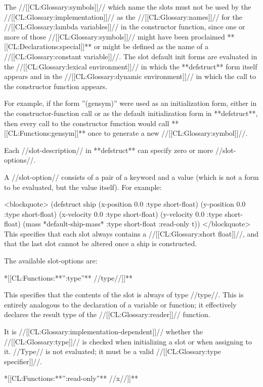 The //[[CL:Glossary:symbols]]// which name the slots must not be used by the //[[CL:Glossary:implementation]]// as the //[[CL:Glossary:names]]// for the //[[CL:Glossary:lambda variables]]// in the constructor function, since one or more of those //[[CL:Glossary:symbols]]// might have been proclaimed **[[CL:Declarations:special]]** or might be defined as the name of a //[[CL:Glossary:constant variable]]//. The slot default init forms are evaluated in the //[[CL:Glossary:lexical environment]]// in which the **defstruct** form itself appears and in the //[[CL:Glossary:dynamic environment]]// in which the call to the constructor function appears.

For example, if the form ''(gensym)'' were used as an initialization form, either in the constructor-function call or as the default initialization form in **defstruct**, then every call to the constructor function would call **[[CL:Functions:gensym]]** once to generate a new //[[CL:Glossary:symbol]]//.

Each //slot-description// in **defstruct** can specify zero or more //slot-options//.

A //slot-option// consists of a pair of a keyword and a value (which is not a form to be evaluated, but the value itself). For example:

<blockquote> (defstruct ship (x-position 0.0 :type short-float) (y-position 0.0 :type short-float) (x-velocity 0.0 :type short-float) (y-velocity 0.0 :type short-float) (mass *default-ship-mass* :type short-float :read-only t)) </blockquote> This specifies that each slot always contains a //[[CL:Glossary:short float]]//, and that the last slot cannot be altered once a ship is constructed.



The available slot-options are: \beginlist

\itemitem**[[CL:Functions:**'':type''** //type//]]**

This specifies that the contents of the slot is always of type //type//. This is entirely analogous to the declaration of a variable or function; it effectively declares the result type of the //[[CL:Glossary:reader]]// function.

It is //[[CL:Glossary:implementation-dependent]]// whether the //[[CL:Glossary:type]]// is checked when initializing a slot or when assigning to it. //Type// is not evaluated; it must be a valid //[[CL:Glossary:type specifier]]//.

\itemitem**[[CL:Functions:**'':read-only''** //x//]]**

